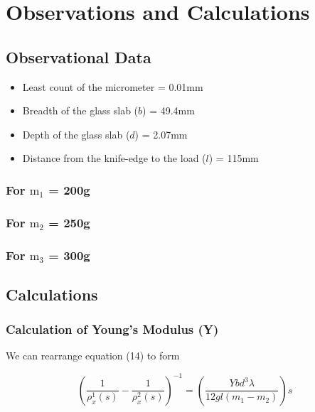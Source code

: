 \section{Observations and Calculations}

    \subsection{Observational Data}
    \begin{itemize}
        \item Least count of the micrometer = 0.01mm
        \item Breadth of the glass slab ($b$) = 49.4mm
        \item Depth of the glass slab ($d$) = 2.07mm
        \item Distance from the knife-edge to the load ($l$) = 115mm
    \end{itemize}
    
    \subsubsection{For $\text{m}_1$ = 200g}
        
        

        
    \subsubsection{For $\text{m}_2$ = 250g}
        
        

    \subsubsection{For $\text{m}_3$ = 300g}
        
        

    \subsection{Calculations}
    \subsubsection{Calculation of Young's Modulus (Y)}

     We can rearrange equation (14) to form 

    \begin{equation}
        \left(\frac{1}{\rho_{x}^1(s)}-\frac{1}{\rho_{x}^2(s)}\right)^{-1} = \left(\frac{Ybd^3\lambda}{12gl(m_1-m_2)}\right)s
    \end{equation}

